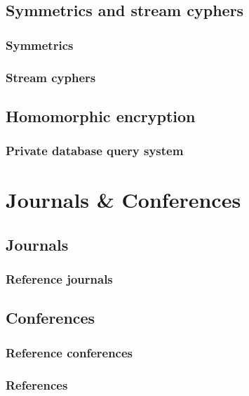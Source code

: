\documentclass{beamer}
\begin{document}
\subsection{Symmetrics and stream cyphers}

\begin{frame}
\frametitle{Symmetrics}
\end{frame}

\begin{frame}
\frametitle{Stream cyphers}
\end{frame}

\subsection{Homomorphic encryption}

\begin{frame}
\frametitle{Private database query system}
\end{frame}

\section{Journals \& Conferences}

\subsection{Journals}

\begin{frame}
\frametitle{Reference journals}
\end{frame}

\subsection{Conferences}

\begin{frame}
\frametitle{Reference conferences}
\end{frame}

\begin{frame}[allowframebreaks]
        \frametitle{References}
        
        
\end{frame}
\end{document}
